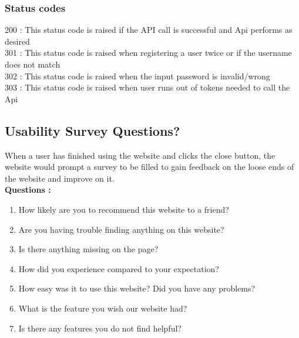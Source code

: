 \documentclass[12pt, titlepage]{article}
\begin{document}
\subsubsection{Status codes}
200 : This status code is raised if the API call is successful and Api performs as desired \\
301 : This status code is raised when registering a user twice or if the username does not match\\
302 : This status code is raised when the input password is invalid/wrong\\
303 : This status code is raised when user runs out of tokens needed to call the Api\\

\subsection{Usability Survey Questions?}
When a user has finished using the website and clicks the close button, the website would prompt a survey to be filled to gain feedback on the loose ends of the website and improve on it. \\
\textbf{Questions :} 

\begin{enumerate}

\item How likely are you to recommend this website to a friend? 
\item Are you having trouble finding anything on this website?  
\item Is there anything missing on the page? 
\item How did you experience compared to your expectation? 
\item How easy was it to use this website? Did you have any problems? 
\item What is the feature you wish our website had? 
\item Is there any features you do not find helpful?

\end{enumerate}
\end{document}
